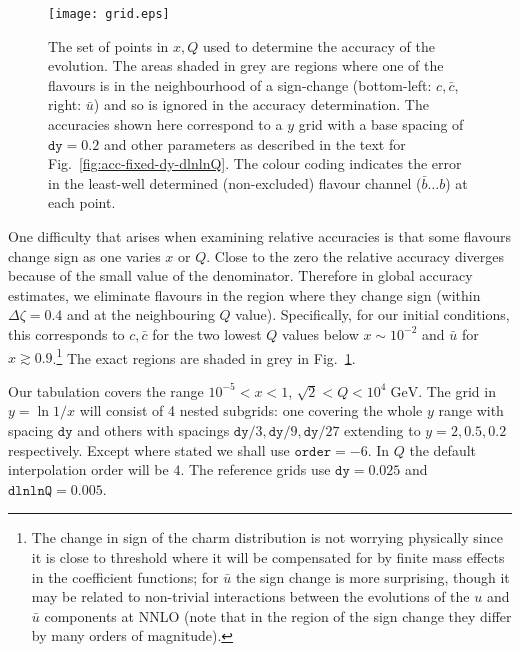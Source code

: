 \documentclass[12pt]{article}
\newcommand{\dy}{\ttt{dy}}
\newcommand{\dlnlnQ}{\ttt{dlnlnQ}}
\newcommand{\GeV}{\;\mathrm{GeV}}
\newcommand{\comment}[1]{\textbf{[#1]}}
\newcommand{\ttt}[1]{\texttt{#1}}
\begin{document}
\begin{figure}
  \centering
  \texttt{[image: grid.eps]}%
  \caption{The set of points in $x, Q$ used to determine the accuracy
    of the evolution. The areas shaded in grey are regions where one
    of the flavours is in the neighbourhood of a sign-change
    (bottom-left: $c,\bar c$, right: $\bar u$) and so is ignored in
    the accuracy determination.  The accuracies shown here correspond
    to a $y$ grid with a base spacing of $\ttt{dy}=0.2$ and other
    parameters as described in the text for
    Fig.~\ref{fig:acc-fixed-dy-dlnlnQ}.
    The colour coding indicates the error in the least-well determined
    (non-excluded) flavour channel ($\bar b \ldots b$) at each point.
  }
  \label{fig:grid}
\end{figure}


One difficulty that arises when examining relative accuracies is that
some flavours change sign as one varies $x$ or $Q$. Close to the zero
the relative accuracy diverges because of the small value of the
denominator. Therefore in global accuracy estimates, we eliminate
flavours in the region where they change sign (within $\Delta
\zeta=0.4$ and at the neighbouring $Q$ value). Specifically, for our
initial conditions, this corresponds to $c,\bar c$ for the two lowest
$Q$ values below $x\sim 10^{-2}$ and $\bar u$ for $x\gtrsim
0.9$.\footnote{The change in sign of the charm distribution is not
  worrying physically since it is close to threshold where it will be
  compensated for by finite mass effects in the coefficient functions;
  for $\bar u$ the sign change is more surprising, though it may be
  related to non-trivial interactions between the evolutions of the
  $u$ and $\bar u$ components at NNLO (note that in the region of the
  sign change they differ by many orders of magnitude).  } %
The exact regions are shaded in grey in Fig.~\ref{fig:grid}.

Our tabulation covers the range $10^{-5}<x<1$, $\sqrt{2} < Q<
10^4\GeV$. The grid in $y=\ln1/x$ will consist of 4 nested subgrids:
one covering the whole $y$ range with spacing $\ttt{dy}$ and others
with spacings $\ttt{dy}/3, \ttt{dy}/9, \ttt{dy}/27$ extending to
$y=2,0.5,0.2$ respectively. Except where stated we shall use
$\ttt{order}=-6$. In $Q$ the default interpolation order will be $4$.
The reference grids use $\dy=0.025$ and $\dlnlnQ=0.005$.
\end{document}
